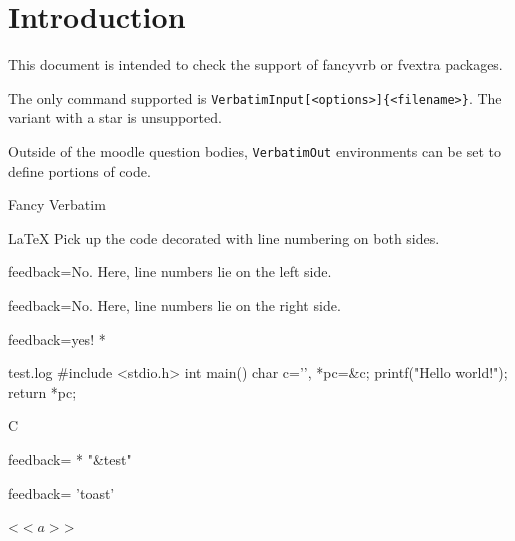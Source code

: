 \documentclass{article}
\newif\iffvextra
\begin{document}
\section*{Introduction}

This document is intended to check the support of \textsf{fancyvrb} or  
\textsf{fvextra} packages.

The only command supported is \texttt{VerbatimInput[<options>]\{<filename>\}}.
The variant with a star is unsupported.

Outside of the moodle question bodies, \texttt{VerbatimOut} environments can be 
set to define portions of code.

\begin{quiz}{Fancy Verbatim}

\begin{multi}{LaTeX}
Pick up the code decorated with line numbering on both sides.
\item[feedback={No. Here, line numbers lie on the left side.}] 
\item[feedback={No. Here, line numbers lie on the right side.}] 
\item[feedback={yes!}]* 
\end{multi}

\begin{filecontents*}[overwrite]{test.log}
#include <stdio.h>
int main() {
    char c='\0', *pc=&c;
    printf("Hello world!\n");
    return *pc;
}
\end{filecontents*}
\begin{multi}{C}

\item[feedback={}]* "\&test"
\item[feedback={}] 'toast'
\item <$<a>$>
\end{multi}

\end{quiz}
\end{document}
